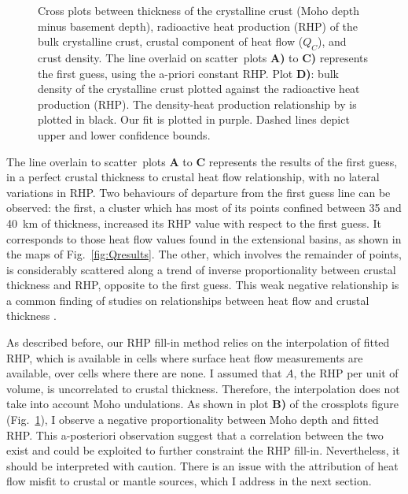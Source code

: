 \begin{figure}
	\begin{adjustbox}{center}
	\end{adjustbox}
	\caption[Cross plots between thickness of the crystalline crust, RHP of the bulk crystalline crust, crustal component of heat flow, and crust density.]{Cross plots between thickness of the crystalline crust (Moho depth minus basement depth), radioactive heat production (RHP) of the bulk crystalline crust, crustal component of heat flow ($Q_C$), and crust density. The line overlaid on scatter~plots \textbf{A)} to \textbf{C)} represents the first guess, using the a-priori constant RHP.
	Plot \textbf{D)}: bulk density of the crystalline crust plotted against the radioactive heat production (RHP). The density-heat production relationship by \textcite{Hasterok2017_ign} is plotted in black. Our fit is plotted in purple. Dashed lines depict upper and lower confidence bounds.}
	\label{fig:Qcrossplots}
\end{figure}

The line overlain to scatter~plots \textbf{A} to \textbf{C} represents the results of the first guess, in a perfect crustal thickness to crustal heat flow relationship, with no lateral variations in RHP.
Two behaviours of departure from the first guess line can be observed: the first, a cluster which has most of its points confined between 35 and 40~\si{\kilo \metre} of thickness, increased its RHP value with respect to the first guess.
It corresponds to those heat flow values found in the extensional basins, as shown in the maps of Fig.~\ref{fig:Qresults}.
The other, which involves the remainder of points, is considerably scattered along a trend of inverse proportionality between crustal thickness and RHP, opposite to the first guess.
This weak negative relationship is a common finding of studies on relationships between heat flow and crustal thickness \parencites{Cermak1993}{Mareschal2013}.

As described before, our RHP fill-in method relies on the interpolation of fitted RHP, which is available in cells where surface heat flow measurements are available, over cells where there are none.
I assumed that $A$, the RHP per unit of volume, is uncorrelated to crustal thickness.
Therefore, the interpolation does not take into account Moho undulations.
As shown in plot \textbf{B)} of the crossplots figure (Fig.~\ref{fig:Qcrossplots}), I observe a negative proportionality between Moho depth and fitted RHP.
This a-posteriori observation suggest that a correlation between the two exist and could be exploited to further constraint the RHP fill-in.
Nevertheless, it should be interpreted with caution.
There is an issue with the attribution of heat flow misfit to crustal or mantle sources, which I address in the next section.

